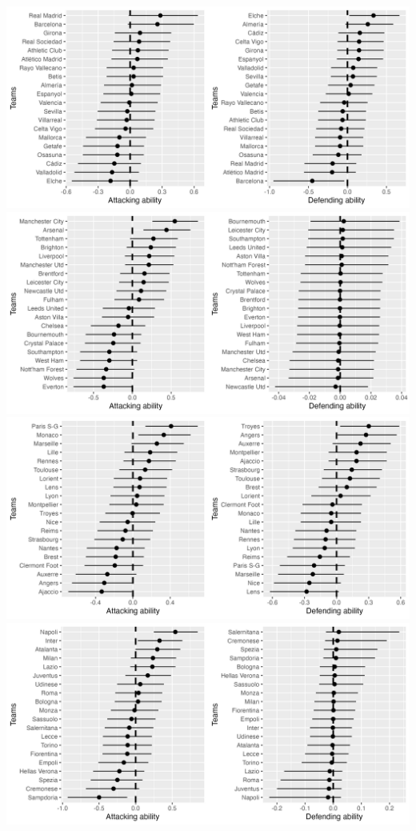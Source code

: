 \documentclass[
]{article}
\begin{document}
\includegraphics[width=33.33in]{llattdef}
\includegraphics[width=33.33in]{plattdef}
\includegraphics[width=33.33in]{l1attdef}
\includegraphics[width=33.33in]{saattdef}
\end{document}
